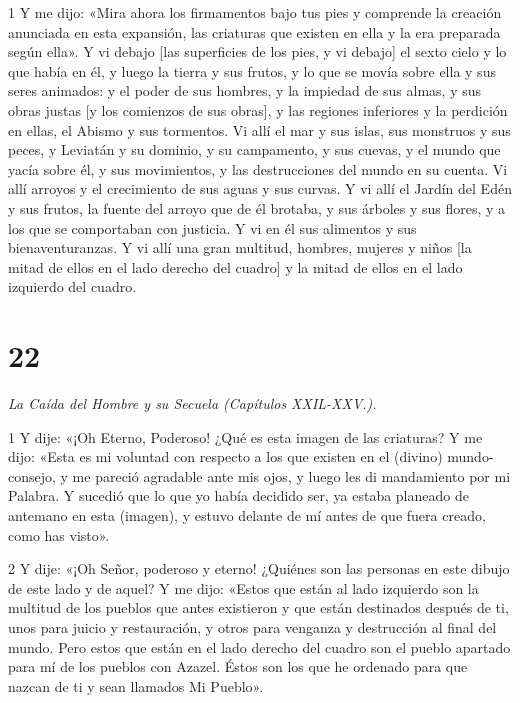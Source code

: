\par 1 Y me dijo: «Mira ahora los firmamentos bajo tus pies y comprende la creación anunciada en esta expansión, las criaturas que existen en ella y la era preparada según ella». Y vi debajo [las superficies de los pies, y vi debajo] el sexto cielo y lo que había en él, y luego la tierra y sus frutos, y lo que se movía sobre ella y sus seres animados: y el poder de sus hombres, y la impiedad de sus almas, y sus obras justas [y los comienzos de sus obras], y las regiones inferiores y la perdición en ellas, el Abismo y sus tormentos. Vi allí el mar y sus islas, sus monstruos y sus peces, y Leviatán y su dominio, y su campamento, y sus cuevas, y el mundo que yacía sobre él, y sus movimientos, y las destrucciones del mundo en su cuenta. Vi allí arroyos y el crecimiento de sus aguas y sus curvas. Y vi allí el Jardín del Edén y sus frutos, la fuente del arroyo que de él brotaba, y sus árboles y sus flores, y a los que se comportaban con justicia. Y vi en él sus alimentos y sus bienaventuranzas. Y vi allí una gran multitud, hombres, mujeres y niños [la mitad de ellos en el lado derecho del cuadro] y la mitad de ellos en el lado izquierdo del cuadro.

\chapter{22}

\par \textit{La Caída del Hombre y su Secuela (Capítulos XXIL-XXV.).}

\par 1 Y dije: «¡Oh Eterno, Poderoso! ¿Qué es esta imagen de las criaturas? Y me dijo: «Esta es mi voluntad con respecto a los que existen en el (divino) mundo-consejo, y me pareció agradable ante mis ojos, y luego les di mandamiento por mi Palabra. Y sucedió que lo que yo había decidido ser, ya estaba planeado de antemano en esta (imagen), y estuvo delante de mí antes de que fuera creado, como has visto».

\par 2 Y dije: «¡Oh Señor, poderoso y eterno! ¿Quiénes son las personas en este dibujo de este lado y de aquel? Y me dijo: «Estos que están al lado izquierdo son la multitud de los pueblos que antes existieron y que están destinados después de ti, unos para juicio y restauración, y otros para venganza y destrucción al final del mundo. Pero estos que están en el lado derecho del cuadro son el pueblo apartado para mí de los pueblos con Azazel. Éstos son los que he ordenado para que nazcan de ti y sean llamados Mi Pueblo».

